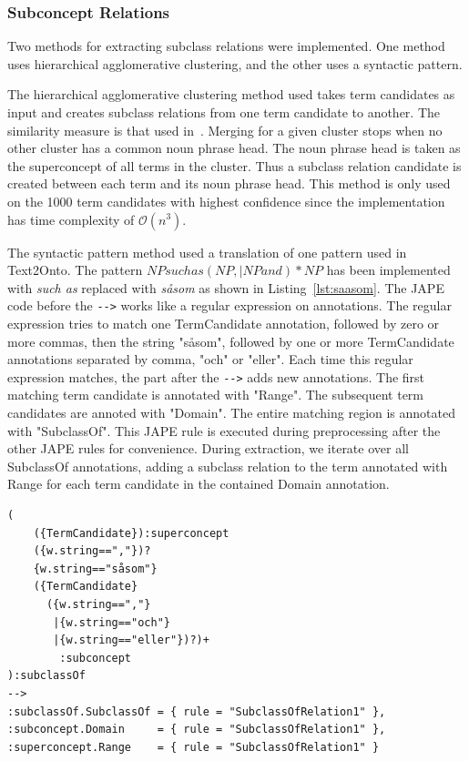 \documentclass[a4paper]{report}
\begin{document}
\subsubsection{Subconcept Relations}

Two methods for extracting subclass relations were implemented.
One method uses hierarchical agglomerative clustering, and the other uses a syntactic pattern.

The hierarchical agglomerative clustering method used takes term candidates as input and creates subclass relations from one term candidate to another.
The similarity measure is that used in~\cite{Drymonas10OntoGain}.
Merging for a given cluster stops when no other cluster has a common noun phrase head.
The noun phrase head is taken as the superconcept of all terms in the cluster.
Thus a subclass relation candidate is created between each term and its noun phrase head.
This method is only used on the 1000 term candidates with highest confidence since the implementation has time complexity of \(\mathcal{O}(n^{3})\).

The syntactic pattern method used a translation of one pattern used in Text2Onto\cite{Cimiano2005Text2Onto}.
The pattern \(NP such as (NP, |NP and)* NP\) has been implemented with \emph{such as} replaced with \emph{såsom} as shown in Listing~\ref{lst:saasom}.
The JAPE code before the \verb+-->+ works like a regular expression on annotations.
The regular expression tries to match one TermCandidate annotation, followed by zero or more commas, then the string "såsom", followed by one or more TermCandidate annotations separated by comma, "och" or "eller".
Each time this regular expression matches, the part after the \verb+-->+ adds new annotations.
The first matching term candidate is annotated with "Range".
The subsequent term candidates are annoted with "Domain".
The entire matching region is annotated with "SubclassOf".
This JAPE rule is executed during preprocessing after the other JAPE rules for convenience.
During extraction, we iterate over all SubclassOf annotations, adding a subclass relation to the term annotated with Range for each term candidate in the contained Domain annotation.

\begin{Code}
\begin{lstlisting}[frame=single]
(
	({TermCandidate}):superconcept
	({w.string==","})?
	{w.string=="såsom"}
	({TermCandidate}
	  ({w.string==","}
	   |{w.string=="och"}
	   |{w.string=="eller"})?)+
	    :subconcept
):subclassOf
-->
:subclassOf.SubclassOf = { rule = "SubclassOfRelation1" },
:subconcept.Domain     = { rule = "SubclassOfRelation1" },
:superconcept.Range    = { rule = "SubclassOfRelation1" }
\end{lstlisting}
\end{Code}
\end{document}
